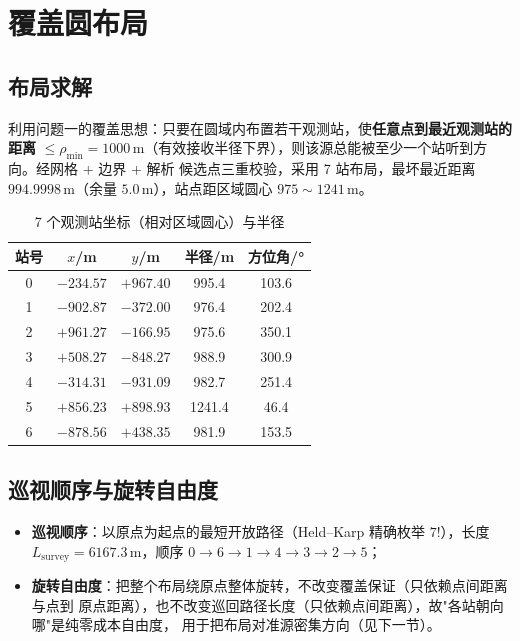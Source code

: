 \documentclass[a4paper,11pt]{ctexart}
\begin{document}
\section{覆盖圆布局}
\subsection{布局求解}
利用问题一的覆盖思想：只要在圆域内布置若干观测站，使\textbf{任意点到最近观测站的距离} $\le
\rho_{\min}=1000$\,m（有效接收半径下界），则该源总能被至少一个站听到方向。经网格 + 边界 + 解析
候选点三重校验，采用 7 站布局，最坏最近距离 $994.9998$\,m（余量 $5.0$\,m），站点距区域圆心
$975\sim1241$\,m。

\begin{table}[H]
  \centering
  \caption{7 个观测站坐标（相对区域圆心）与半径}
  \label{tab:centers}
  \begin{tabular}{ccccc}
    \toprule
    站号 & $x$/m & $y$/m & 半径/m & 方位角/° \\
    \midrule
    0 & $-234.57$ & $+967.40$ & 995.4 & 103.6 \\
    1 & $-902.87$ & $-372.00$ & 976.4 & 202.4 \\
    2 & $+961.27$ & $-166.95$ & 975.6 & 350.1 \\
    3 & $+508.27$ & $-848.27$ & 988.9 & 300.9 \\
    4 & $-314.31$ & $-931.09$ & 982.7 & 251.4 \\
    5 & $+856.23$ & $+898.93$ & 1241.4 & 46.4 \\
    6 & $-878.56$ & $+438.35$ & 981.9 & 153.5 \\
    \bottomrule
  \end{tabular}
\end{table}

\subsection{巡视顺序与旋转自由度}
\begin{itemize}
  \item \textbf{巡视顺序}：以原点为起点的最短开放路径（Held--Karp 精确枚举 $7!$），长度
        $L_{\text{survey}}=6167.3$\,m，顺序 $0\to6\to1\to4\to3\to2\to5$；
  \item \textbf{旋转自由度}：把整个布局绕原点整体旋转，不改变覆盖保证（只依赖点间距离与点到
        原点距离），也不改变巡回路径长度（只依赖点间距离），故"各站朝向哪"是纯零成本自由度，
        用于把布局对准源密集方向（见下一节）。
\end{itemize}
\end{document}
